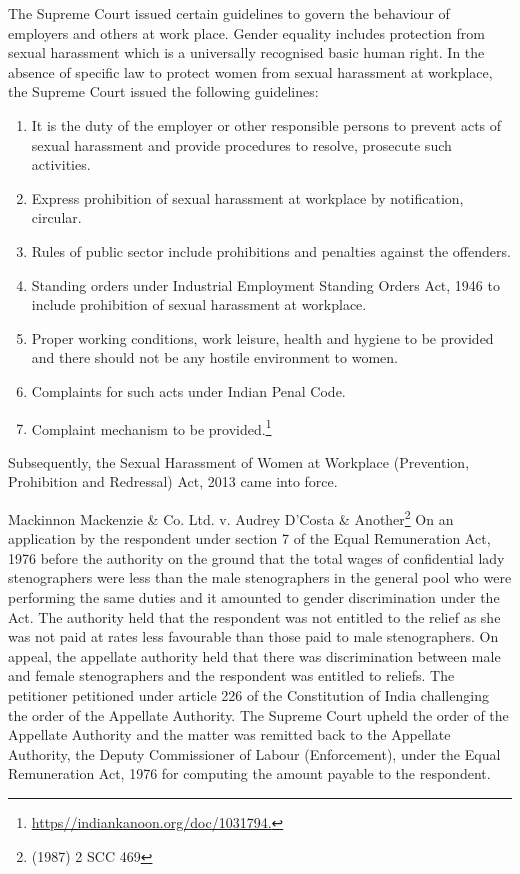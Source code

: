 \begin{multicols}{2}
\noi
The Supreme Court issued certain guidelines to govern the behaviour of employers and
others at work place. Gender equality includes protection from sexual harassment which is a
universally recognised basic human right. In the absence of specific law to protect women
from sexual harassment at workplace, the Supreme Court issued the following guidelines:

\begin{enumerate}
\item It is the duty of the employer or other responsible persons to prevent acts of sexual
harassment and provide procedures to resolve, prosecute such activities.

\item Express prohibition of sexual harassment at workplace by notification, circular.

\item Rules of public sector include prohibitions and penalties against the offenders.

\item Standing orders under Industrial Employment Standing Orders Act, 1946 to include
prohibition of sexual harassment at workplace.

\item Proper working conditions, work leisure, health and hygiene to be provided and there
should not be any hostile environment to women.

\item Complaints for such acts under Indian Penal Code.

\item Complaint mechanism to be provided.\footnote{\url{https//indiankanoon.org/doc/1031794.}}
\end{enumerate}

\noi
Subsequently, the Sexual Harassment of Women at Workplace (Prevention, Prohibition and
Redressal) Act, 2013 came into force.


\noi
Mackinnon Mackenzie \& Co. Ltd. v. Audrey D’Costa \& Another\footnote{(1987) 2 SCC 469} On an application by the
respondent under section 7 of the Equal Remuneration Act, 1976 before the authority on the
ground that the total wages of confidential lady stenographers were less than the male
stenographers in the general pool who were performing the same duties and it amounted to
gender discrimination under the Act. The authority held that the respondent was not entitled
to the relief as she was not paid at rates less favourable than those paid to male stenographers.
On appeal, the appellate authority held that there was discrimination between male and
female stenographers and the respondent was entitled to reliefs. The petitioner petitioned
under article 226 of the Constitution of India challenging the order of the Appellate
Authority. The Supreme Court upheld the order of the Appellate Authority and the matter
was remitted back to the Appellate Authority, the Deputy Commissioner of Labour
(Enforcement), under the Equal Remuneration Act, 1976 for computing the amount payable
to the respondent.


\end{multicols}
